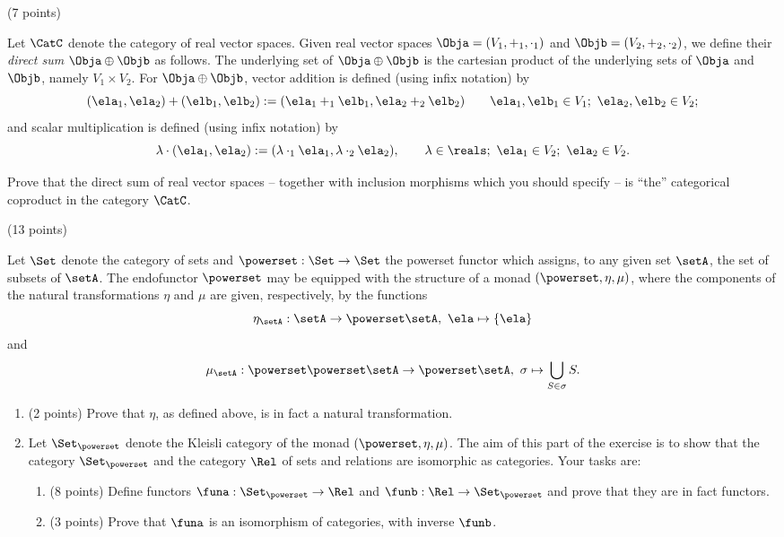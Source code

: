 \documentclass[paper=8.125in:10.250in,pagesize=pdftex,
    headinclude=false,footinclude=false,oneside,egregdoesnotlikesansseriftitles]{kaobook}
\begin{document}
\begin{gradedexercise}\label{ex:DirectSumCopr} (7 points) 


Let $\CatC$ denote the category of real vector spaces. Given real vector spaces $\Obja = (V_1, +_1, \cdot_1)$ and $\Objb = (V_2, +_2, \cdot_2)$, we define their \emph{direct sum} $\Obja \oplus \Objb$ as follows. 
The underlying set of $\Obja \oplus \Objb$ is the cartesian product of the underlying sets of $\Obja$ and $\Objb$, namely $V_1 \times V_2$. For $\Obja \oplus \Objb$, vector addition is defined (using infix notation) by
$$(\ela_1, \ela_2) + (\elb_1, \elb_2) := (\ela_1 +_1 \elb_1, \ela_2 +_2 \elb_2) \quad \quad \ela_1, \elb_1 \in V_1; \ \ela_2, \elb_2 \in V_2;$$
and scalar multiplication is defined (using infix notation) by
$$\lambda \cdot (\ela_1, \ela_2) := (\lambda \cdot_1 \ela_1, \lambda \cdot_2 \ela_2), \quad \quad \lambda \in \reals; \ \ela_1 \in V_2; \ \ela_2 \in V_2.$$

Prove that the direct sum of real vector spaces -- together with inclusion morphisms which you should specify -- is ``the'' categorical coproduct in the category $\CatC$. 
\end{gradedexercise}


\newpage



\begin{gradedexercise}\label{ex:RelKleisli} (13 points) 

Let $\Set$ denote the category of sets and $\powerset : \Set \to \Set$ the powerset functor which assigns, to any given set $\setA$, the set of subsets of $\setA$. The endofunctor $\powerset$ may be equipped with the structure of a monad $(\powerset, \eta, \mu)$, where the components of the natural transformations $\eta$ and $\mu$ are given, respectively, by the functions
$$ \eta_{\setA} : \setA \to \powerset \setA, \ \ela \mapsto \{ \ela \}$$
and
$$ \mu_{\setA} : \powerset \powerset \setA \to \powerset \setA, \ \sigma \mapsto \bigcup_{S \in \sigma} S.$$

\begin{enumerate}
\item (2 points) Prove that $\eta$, as defined above, is in fact a natural transformation. 
\item Let $\Set_{\powerset}$ denote the Kleisli category of the monad $(\powerset, \eta, \mu)$. The aim of this part of the exercise is to show that the category $\Set_{\powerset}$ and the category $\Rel$ of sets and relations are isomorphic as categories. Your tasks are:
\begin{enumerate}
\item (8 points) Define functors $\funa: \Set_{\powerset} \to \Rel$ and $\funb: \Rel \to \Set_{\powerset}$ and prove that they are in fact functors. 
\item (3 points) Prove that $\funa$ is an isomorphism of categories, with inverse $\funb$. 
\end{enumerate}
\end{enumerate}
\end{gradedexercise}


\newpage
\end{document}
